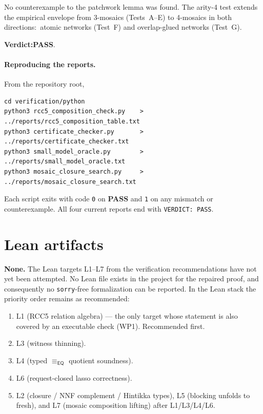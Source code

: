 \documentclass[11pt]{article}
\newcommand{\EQ}{\mathsf{EQ}}
\newcommand{\eqrel}{\equiv_{\EQ}}
\newcommand{\PASS}{\textcolor{black!70!green}{\textbf{PASS}}}
\begin{document}
No counterexample to the patchwork lemma was found.  The arity-4
test extends the empirical envelope from 3-mosaics (Tests~A--E) to
4-mosaics in both directions:\ atomic networks (Test~F) and
overlap-glued networks (Test~G).

\textbf{Verdict:}\quad \PASS{}.

\paragraph{Reproducing the reports.}
From the repository root,
\begin{lstlisting}
cd verification/python
python3 rcc5_composition_check.py    > ../reports/rcc5_composition_table.txt
python3 certificate_checker.py       > ../reports/certificate_checker.txt
python3 small_model_oracle.py        > ../reports/small_model_oracle.txt
python3 mosaic_closure_search.py     > ../reports/mosaic_closure_search.txt
\end{lstlisting}
Each script exits with code \texttt{0} on \PASS{} and \texttt{1} on
any mismatch or counterexample.  All four current reports end with
\texttt{VERDICT: PASS}.

\section{Lean artifacts}

\textbf{None.}  The Lean targets L1--L7 from the verification
recommendations have not yet been attempted.  No Lean file exists
in the project for the repaired proof, and consequently no
\texttt{sorry}-free formalization can be reported.  In the Lean
stack the priority order remains as recommended:
\begin{enumerate}[leftmargin=2em]
  \item L1 (RCC5 relation algebra) --- the only target whose
    statement is also covered by an executable check (WP1).
    Recommended first.
  \item L3 (witness thinning).
  \item L4 (typed \(\eqrel\) quotient soundness).
  \item L6 (request-closed lasso correctness).
  \item L2 (closure / NNF complement / Hintikka types),
    L5 (blocking unfolds to fresh), and L7 (mosaic composition
    lifting) after L1/L3/L4/L6.
\end{enumerate}
\end{document}
